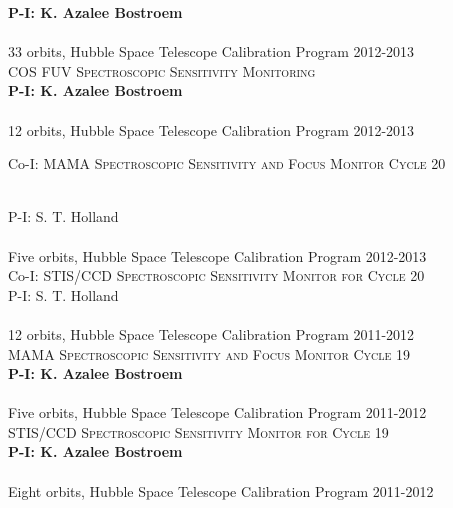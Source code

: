 \documentclass[10pt]{cv}
\begin{document}
\begin{llist}
{\bf P-I: K. Azalee Bostroem} \\ %
\\
33 orbits, Hubble Space Telescope Calibration Program \hfill 2012-2013\\ %
\textsc{COS FUV Spectroscopic Sensitivity Monitoring}\\
{\bf P-I: K. Azalee Bostroem} \\ %
\\
12 orbits, Hubble Space Telescope Calibration Program \hfill  2012-2013\\ %
\begin{minipage}[l]{0.7\textwidth}\vspace{0.15cm}
Co-I: \textsc{MAMA Spectroscopic Sensitivity and Focus Monitor Cycle 20}
\end{minipage}\vspace{0.15cm}\\
P-I: S. T. Holland\\ %
\\
Five orbits, Hubble Space Telescope Calibration Program \hfill  2012-2013\\ %
Co-I: \textsc{STIS/CCD Spectroscopic Sensitivity Monitor for Cycle 20} \\
P-I: S. T. Holland\\ %
\\
12 orbits, Hubble Space Telescope Calibration Program \hfill 2011-2012\\ %
\textsc{MAMA Spectroscopic Sensitivity and Focus Monitor Cycle 19}\\
{\bf P-I: K. Azalee Bostroem} \\ %
\\
Five orbits, Hubble Space Telescope Calibration Program \hfill 2011-2012\\ %
\textsc{STIS/CCD Spectroscopic Sensitivity Monitor for Cycle 19}\\
{\bf P-I: K. Azalee Bostroem} \\ %
\\
Eight orbits, Hubble Space Telescope Calibration Program \hfill 2011-2012\\ %
\begin{minipage}[l]{0.7\textwidth}\vspace{0.15cm}

\end{minipage}
\end{llist}
\end{document}
